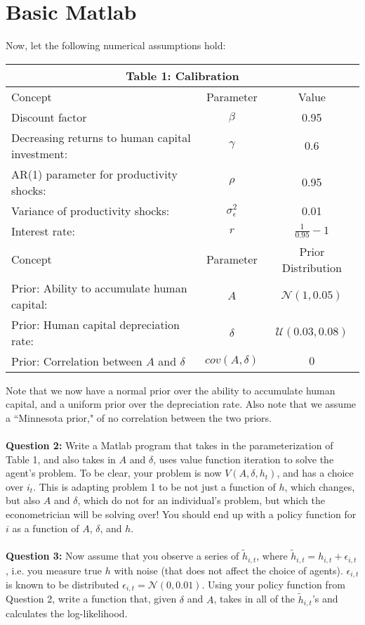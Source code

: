 \documentclass[11pt]{article}
\begin{document}
\section{Basic Matlab}
Now, let the following numerical assumptions hold:
\begin{table}[ht!]
\centering
\begin{tabular}{lcc}
\hline
\hline
\multicolumn{3}{c}{Table 1: Calibration}\\
\hline
Concept & Parameter & Value \\ 
Discount factor & $\beta$ & 0.95\\
Decreasing returns to human capital investment: & $\gamma$  & 0.6\\
AR(1) parameter for productivity shocks: & $\rho$  & 0.95\\
Variance of productivity shocks: &  $\sigma^2_\epsilon$  & 0.01\\
Interest rate: &  $r$  & $\frac{1}{0.95}-1$\\
\hline
Concept & Parameter & Prior Distribution \\ 
Prior: Ability to accumulate human capital: &  $A$ & $\mathcal{N}\left(1,0.05\right)$\\
Prior: Human capital depreciation rate:&  $\delta$  & $\mathcal{U}\left(0.03,0.08\right)$\\
Prior: Correlation between $A$ and $\delta$ &  $cov(A,\delta)$  & $0$\\
\hline
\end{tabular}
\end{table}
Note that we now have a normal prior over the ability to accumulate human capital, and a uniform prior over the depreciation rate.  Also note that we assume  a ``Minnesota prior," of no correlation between the two priors.  \\
\ \\
\textbf{Question 2:} Write a Matlab program that takes in the parameterization of Table 1, and also takes in $A$ and $\delta$, uses value function iteration to solve the agent's problem.  To be clear, your problem is now $V(A,\delta,h_t)$, and has a choice over $i_t$.  This is adapting problem 1 to be not just a function of $h$, which changes, but also $A$ and $\delta$, which do not for an individual's problem, but which the econometrician will be solving over!  You should end up with a policy function for $i$ as a function of $A$, $\delta$, and $h$.  \\
\ \\

\textbf{Question 3:} Now assume that you observe a series of $\tilde{h}_{i,t}$, where $\tilde{h}_{i,t}=h_{i,t}+\epsilon_{i,t}$, i.e. you measure true $h$ with noise (that does not affect the choice of agents).  $\epsilon_{i,t}$ is known to be distributed $\epsilon_{i,t}=\mathcal{N}\left(0,0.01\right)$.  Using your policy function from Question 2, write a function that, given $\delta$ and $A$, takes in all of the $\tilde{h}_{i,t}$'s and calculates the log-likelihood.  \\
\ \\
\end{document}
